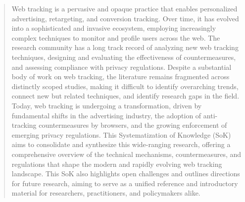 \begin{abstract}
Web tracking is a pervasive and opaque practice that enables personalized advertising, retargeting, and conversion tracking. 
%
Over time, it has evolved into a sophisticated and invasive ecosystem, employing increasingly complex techniques to monitor and profile users across the web. 
%
The research community has a long track record of analyzing new web tracking techniques, designing and evaluating the effectiveness of countermeasures, and assessing compliance with privacy regulations. 
%
Despite a substantial body of work on web tracking, the literature remains fragmented across distinctly scoped studies, making it difficult to identify overarching trends, connect new but related techniques, and identify research gaps in the field. 
%
Today, web tracking is undergoing a transformation, driven by fundamental shifts in the advertising industry, the adoption of anti-tracking countermeasures by browsers, and the growing enforcement of emerging privacy regulations. 
%
This Systematization of Knowledge (SoK) aims to consolidate and synthesize this wide-ranging research, offering a comprehensive overview of the technical mechanisms, countermeasures, and regulations that shape the modern and rapidly evolving web tracking landscape. 
%
This SoK also highlights open challenges and outlines directions for future research, aiming to serve as a unified reference and introductory material for researchers, practitioners, and policymakers alike. 
\end{abstract}